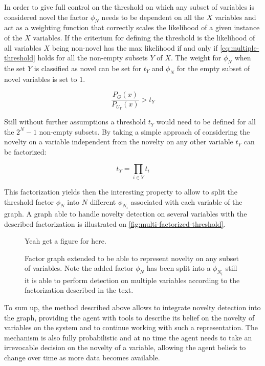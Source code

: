 In order to give full control on the threshold on which any subset of
variables is considered novel the factor $\phi_N$ needs to be dependent on all
the $X$ variables and act as a weighting function that correctly scales the
likelihood of a given instance of the $X$ variables.
If the criterium for defining the threshold is the likelihood of all variables
$X$ being non-novel has the max likelihood if and only if
\autoref{eq:multiple-threshold} holds for all the non-empty subsets $Y$ of $X$.
The weight for $\phi_N$ when the set $Y$ is classified as novel
can be set for $t_Y$ and $\phi_N$ for the empty subset of novel variables is set
to $1$.

\begin{equation}
\label{eq:multiple-threshold}
\frac{P_G(x)}{P_{U_Y}(x)} > t_Y
\end{equation}

Still without further assumptions a threshold $t_Y$ would need to be defined for
all the $2^N-1$ non-empty subsets.
By taking a simple approach of considering the novelty on a variable independent
from the novelty on any other variable $t_Y$ can be factorized:

\begin{equation}
t_Y = \prod_{i \in Y}{t_i}
\end{equation}

This factorization yields then the interesting property to allow to split the
threshold factor $\phi_N$ into $N$ different $\phi_{N_i}$ associated with each
variable of the graph. A graph able to handle novelty detection on several
variables with the described factorization is illustrated on
\autoref{fig:multi-factorized-threshold}.

\begin{figure}[h]
\centering
Yeah get a figure for here.
\caption{\label{fig:multi-factorized-threshold}Factor graph extended to be able
         to represent novelty on any subset of variables. Note the added factor
         $\phi_N$ has been split into a $\phi_{N_i}$ still it is able to perform
         detection on multiple variables according to the factorization
         described in the text.}
\end{figure}


To sum up, the method described above allows to integrate novelty detection
into the graph, providing the agent with tools to describe its belief on the
novelty of variables on the system and to continue working with such a
representation. The mechanism is also fully probabilistic and at no time
the agent needs to take an irrevocable decision on the novelty of a variable,
allowing the agent beliefs to change over time as more data becomes available.



